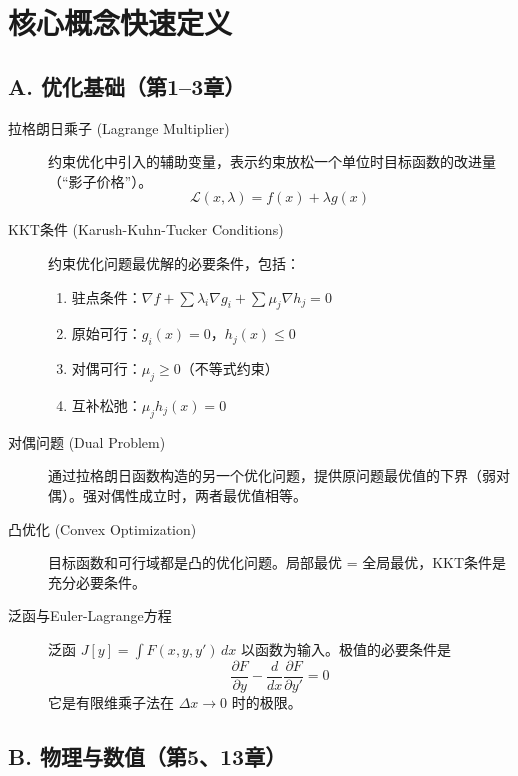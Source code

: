 \section*{核心概念快速定义}

\subsection*{A. 优化基础（第1--3章）}

\begin{description}
    \item[拉格朗日乘子 (Lagrange Multiplier)]
    约束优化中引入的辅助变量，表示约束放松一个单位时目标函数的改进量（“影子价格”）。
    \[
    \mathcal{L}(x, \lambda) = f(x) + \lambda g(x)
    \]

    \item[KKT条件 (Karush-Kuhn-Tucker Conditions)]
    约束优化问题最优解的必要条件，包括：
    \begin{enumerate}
        \item 驻点条件：$\nabla f + \sum \lambda_i \nabla g_i + \sum \mu_j \nabla h_j = 0$
        \item 原始可行：$g_i(x) = 0$，$h_j(x) \leq 0$
        \item 对偶可行：$\mu_j \geq 0$（不等式约束）
        \item 互补松弛：$\mu_j h_j(x) = 0$
    \end{enumerate}

    \item[对偶问题 (Dual Problem)]
    通过拉格朗日函数构造的另一个优化问题，提供原问题最优值的下界（弱对偶）。强对偶性成立时，两者最优值相等。

    \item[凸优化 (Convex Optimization)]
    目标函数和可行域都是凸的优化问题。局部最优 = 全局最优，KKT条件是充分必要条件。

    \item[泛函与Euler-Lagrange方程]
    泛函 $J[y]=\int F(x,y,y')\,dx$ 以函数为输入。极值的必要条件是
    \[
    \frac{\partial F}{\partial y} - \frac{d}{dx}\frac{\partial F}{\partial y'} = 0
    \]
    它是有限维乘子法在 $\Delta x \to 0$ 时的极限。
\end{description}

\subsection*{B. 物理与数值（第5、13章）}


